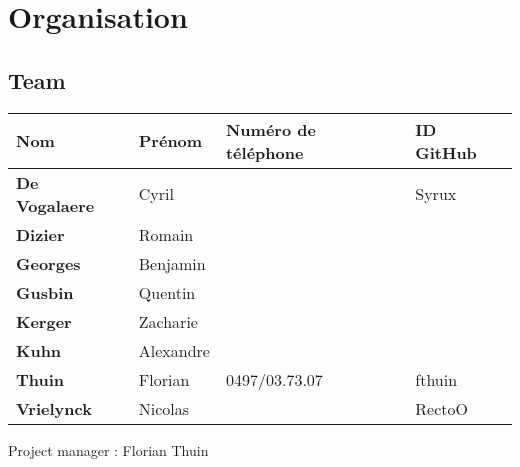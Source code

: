 \section{Organisation}

\subsection{Team}

\begin{tabular}{|l|l|l|l|}
    \hline
    Nom & Prénom & Numéro de téléphone & ID GitHub \\
    \hline
    \hline
    \textbf{De Vogalaere} & Cyril & & Syrux\\
    \hline
    \textbf{Dizier} & Romain & & \\
    \hline
    \textbf{Georges} & Benjamin & & \\
    \hline
    \textbf{Gusbin} & Quentin & & \\
    \hline
    \textbf{Kerger} & Zacharie & & \\
    \hline
    \textbf{Kuhn} & Alexandre & & \\
    \hline
    \textbf{Thuin} & Florian & 0497/03.73.07 & fthuin\\
    \hline
    \textbf{Vrielynck} & Nicolas & & RectoO \\
    \hline
\end{tabular}

Project manager : Florian Thuin

